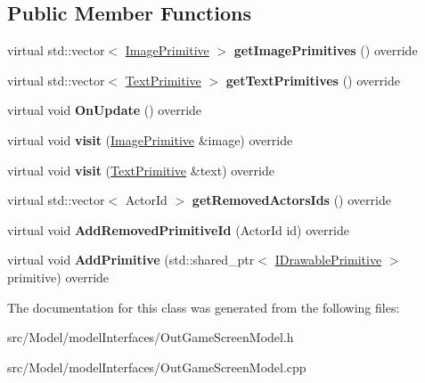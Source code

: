 \subsection*{Public Member Functions}
\begin{DoxyCompactItemize}
\item 
virtual std\+::vector$<$ \hyperlink{classImagePrimitive}{Image\+Primitive} $>$ {\bfseries get\+Image\+Primitives} () override\hypertarget{classOutGameScreenModel_a0ba9ff9ae228624f84b42406670072fd}{}\label{classOutGameScreenModel_a0ba9ff9ae228624f84b42406670072fd}

\item 
virtual std\+::vector$<$ \hyperlink{classTextPrimitive}{Text\+Primitive} $>$ {\bfseries get\+Text\+Primitives} () override\hypertarget{classOutGameScreenModel_ada476b24a0d499285d39990069f69f41}{}\label{classOutGameScreenModel_ada476b24a0d499285d39990069f69f41}

\item 
virtual void {\bfseries On\+Update} () override\hypertarget{classOutGameScreenModel_a9ae5749fc47969302fd01ea77fc3008a}{}\label{classOutGameScreenModel_a9ae5749fc47969302fd01ea77fc3008a}

\item 
virtual void {\bfseries visit} (\hyperlink{classImagePrimitive}{Image\+Primitive} \&image) override\hypertarget{classOutGameScreenModel_aca71a7b74725328a1a1471d1a19c81bc}{}\label{classOutGameScreenModel_aca71a7b74725328a1a1471d1a19c81bc}

\item 
virtual void {\bfseries visit} (\hyperlink{classTextPrimitive}{Text\+Primitive} \&text) override\hypertarget{classOutGameScreenModel_a5df3ffee075d4608eb6615284f82fa27}{}\label{classOutGameScreenModel_a5df3ffee075d4608eb6615284f82fa27}

\item 
virtual std\+::vector$<$ Actor\+Id $>$ {\bfseries get\+Removed\+Actors\+Ids} () override\hypertarget{classOutGameScreenModel_a07cb2f74c8ffa30462d606cd7ecc201d}{}\label{classOutGameScreenModel_a07cb2f74c8ffa30462d606cd7ecc201d}

\item 
virtual void {\bfseries Add\+Removed\+Primitive\+Id} (Actor\+Id id) override\hypertarget{classOutGameScreenModel_a37b20cff94d8707b8bcacecfa64d3060}{}\label{classOutGameScreenModel_a37b20cff94d8707b8bcacecfa64d3060}

\item 
virtual void {\bfseries Add\+Primitive} (std\+::shared\+\_\+ptr$<$ \hyperlink{classIDrawablePrimitive}{I\+Drawable\+Primitive} $>$ primitive) override\hypertarget{classOutGameScreenModel_a042cdde3bb9df9e5ee94b517f21fc795}{}\label{classOutGameScreenModel_a042cdde3bb9df9e5ee94b517f21fc795}

\end{DoxyCompactItemize}


The documentation for this class was generated from the following files\+:\begin{DoxyCompactItemize}
\item 
src/\+Model/model\+Interfaces/Out\+Game\+Screen\+Model.\+h\item 
src/\+Model/model\+Interfaces/Out\+Game\+Screen\+Model.\+cpp\end{DoxyCompactItemize}
